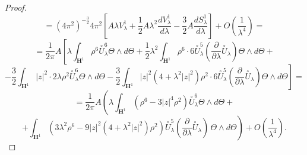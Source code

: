 \documentclass[a4paper,12pt]{amsart}
\newcommand{\de}{\partial}
\renewcommand{\H}{\mathbf{H}}
\renewcommand{\l}{\lambda }
\begin{document}
\begin{proof}
$$= (4\pi^2)^{-\frac{3}{2}}4\pi^2\left[A\lambda V_{\lambda}^1 + \frac{1}{2}A\lambda^2\frac{dV_{\lambda}^1}{d\lambda} - \frac{3}{2}A\frac{dS^1_{\lambda}}{d\lambda} \right] +O\left(\frac{1}{\lambda^4}\right) =$$
$$= \frac{1}{2\pi}A\left[\lambda\int_{\H^1} \rho^6 \overset{\circ}{U}_\l^6\Theta\wedge d\Theta + \frac{1}{2}\lambda^2\int_{\H^1}\rho^6 \cdot6\overset{\circ}{U}_\l^5\left(\frac{\de}{\de \lambda}\overset{\circ}{U}_\l\right)\Theta\wedge d\Theta +\right.$$
$$\left.-\frac{3}{2} \int_{\H^1} |z|^2\cdot 2\lambda\rho^2 \overset{\circ}{U}_\lambda^6\Theta\wedge d\Theta -\frac{3}{2} \int_{\H^1} |z|^2 (4 + \lambda^2 |z|^2) \rho^2 \cdot 6\overset{\circ}{U}_\lambda^5\left(\frac{\de}{\de \lambda}\overset{\circ}{U}_\l\right)\Theta\wedge d\Theta\right]=$$
$$= \frac{1}{2\pi}A\left( \l \int_{\H^1} \left(\rho^6 -3|z|^4 \rho^2\right)\overset{\circ}{U}_\l^6 \Theta\wedge d\Theta+ \right.$$
 $$\left.+  \int_{\H^1}\left(3\lambda^2\rho^6 -9|z|^2 (4 + \lambda^2 |z|^2) \rho^2\right) \overset{\circ}{U}_\lambda^5\left(\frac{\de}{\de\lambda}\overset{\circ}{U}_{\lambda} \right) \, \Theta\wedge d\Theta\right) +O\left(\frac{1}{\lambda^4}\right).$$


\end{proof}
\end{document}
